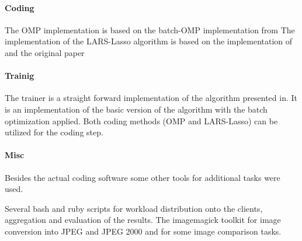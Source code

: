 \paragraph{Coding}
The OMP implementation is based on the batch-OMP implementation
from\cite{Rubinstein} The implementation of the LARS-Lasso algorithm is based on
the implementation of\cite{Strand2005} and the original paper\cite{Efron2004}

\paragraph{Trainig}
The \trainDL trainer is a straight forward implementation of the
algorithm presented in\cite{Mairal2010}. It is an implementation of the basic
version of the algorithm with the batch optimization applied. Both coding
methods (OMP and LARS-Lasso) can be utilized for the coding step.

\paragraph{Misc}
 Besides the actual coding software some other tools for
additional tasks were used.

Several bash and ruby scripts for workload distribution onto the
clients, aggregation and evaluation of the results. The imagemagick toolkit for
image conversion into JPEG and JPEG 2000 and for some image comparison tasks.









